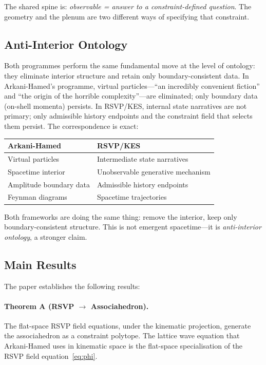 \documentclass[12pt, oneside]{amsart}
\theoremstyle{plain}
\theoremstyle{definition}
\theoremstyle{remark}
\begin{document}
The shared spine is: \emph{observable = answer to a constraint-defined question}. The geometry and the plenum are two different ways of specifying that constraint.

\subsection{Anti-Interior Ontology}

Both programmes perform the same fundamental move at the level of ontology: they eliminate interior structure and retain only boundary-consistent data. In Arkani-Hamed's programme, virtual particles---``an incredibly convenient fiction'' and ``the origin of the horrible complexity''---are eliminated; only boundary data (on-shell momenta) persists. In RSVP/KES, internal state narratives are not primary; only admissible history endpoints and the constraint field that selects them persist. The correspondence is exact:

\begin{center}
\begin{tabular}{ll}
\toprule
Arkani-Hamed & RSVP/KES \\
\midrule
Virtual particles & Intermediate state narratives \\
Spacetime interior & Unobservable generative mechanism \\
Amplitude boundary data & Admissible history endpoints \\
Feynman diagrams & Spacetime trajectories \\
\bottomrule
\end{tabular}
\end{center}

Both frameworks are doing the same thing: remove the interior, keep only boundary-consistent structure. This is not emergent spacetime---it is \emph{anti-interior ontology}, a stronger claim.

\subsection{Main Results}

The paper establishes the following results:

\paragraph{Theorem A (RSVP $\to$ Associahedron).} The flat-space RSVP field equations, under the kinematic projection, generate the associahedron as a constraint polytope. The lattice wave equation that Arkani-Hamed uses in kinematic space is the flat-space specialisation of the RSVP field equation~\eqref{eq:phi}.
\end{document}
